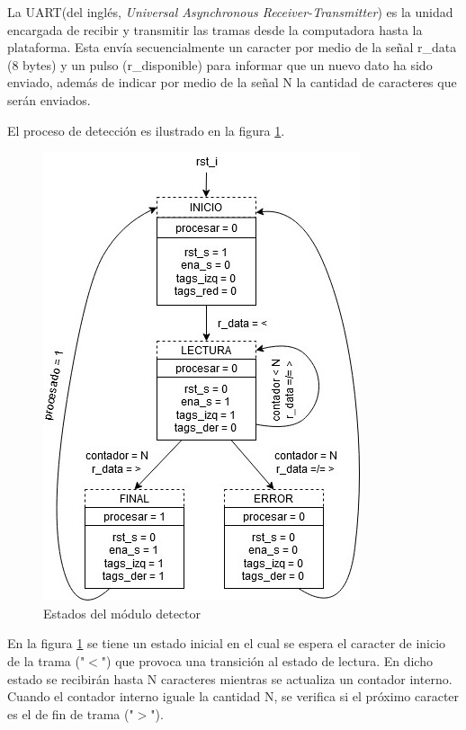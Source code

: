 		\vspace{10cm}
		
		La UART(del inglés, \textit{Universal Asynchronous Receiver-Transmitter}) es la unidad encargada de recibir y transmitir las tramas desde la computadora hasta la plataforma. Esta envía secuencialmente un caracter por medio de la señal r\_data (8 bytes) y un pulso (r\_disponible) para informar que un nuevo dato ha sido enviado, además de indicar por medio de la señal N la cantidad de caracteres que serán enviados. 
		
		El proceso de detección es ilustrado en la figura \ref{fig:Estados_Detector}.  		
		
		\begin{figure}[h]
		\centering
			\includegraphics[scale=.65]{./Figures/Estados-Detector}
			\caption{Estados del módulo detector}
			\label{fig:Estados_Detector}
		\end{figure}
		
		
		En la figura \ref{fig:Estados_Detector} se tiene un estado inicial en el cual se espera el caracter de inicio de la trama ("$<$") que provoca una transición al estado de lectura. En dicho estado se recibirán hasta N caracteres mientras se actualiza un contador interno. Cuando el contador interno iguale la cantidad N, se verifica si el próximo caracter es el de fin de trama ("$>$").
		
